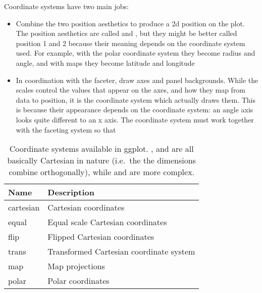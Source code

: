 Coordinate systems have two main jobs: 

\begin{itemize}
  \item Combine the two position aesthetics to produce a 2d position on the plot.  The position aesthetics are called  and , but they might be better called position 1 and 2 because their meaning depends on the coordinate system used.  For example, with the polar coordinate system they become radius and angle, and with maps they become latitude and longitude
  
  \item In coordination with the faceter, draw axes and panel backgrounds.  While the scales control the values that appear on the axes, and how they map from data to position, it is the coordinate system which actually draws them.  This is because their appearance depends on the coordinate system: an angle axis looks quite different to an x axis.  The coordinate system must work together with the faceting system so that 

\end{itemize}


\begin{table}
  \begin{center}
  \begin{tabular}{ll}
    \toprule
    Name      & Description  \\
    \midrule
    cartesian & Cartesian coordinates                  \\
    equal     & Equal scale Cartesian coordinates      \\
    flip      & Flipped Cartesian coordinates          \\
    trans     & Transformed Cartesian coordinate system\\[1em]
    map       & Map projections                        \\
    polar     & Polar coordinates                      \\
    \bottomrule
    
  \end{tabular}
  \end{center}
  \caption{Coordinate systems available in ggplot.  ,  and  are all basically Cartesian in nature (i.e.\ the the dimensions combine orthogonally), while  and  are more complex.}
  \label{tbl:coord}
\end{table}


